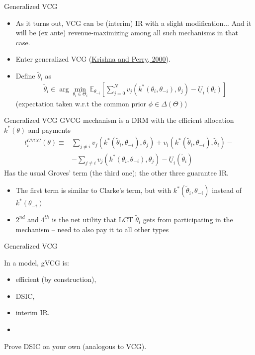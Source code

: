 \documentclass[english,10pt
,aspectratio=169
]{beamer}
\begin{document}
\begin{frame}{Generalized VCG}
	\begin{itemize}
		\item As it turns out, VCG can be (interim) IR with a slight modification... And it will be (ex ante) revenue-maximizing among all such mechanisms in that case.
		\item Enter \alert{generalized VCG} (\href{https://sites.google.com/site/vjkrishna/research}{\uline{Krishna and Perry, 2000}}).
		\pause\medskip
		\item Define  $\tilde{\theta}_i$ as
		\begin{align*}
		\tilde{\theta}_i \in \arg \min_{\theta_i \in \Theta_i} \mathbb{E}_{\theta_{-i}} \left[ \sum_{j=0}^{N} v_j (k^*(\theta_i,\theta_{-i}),\theta_j) - \underline{U}_i (\theta_i) \right]
		\end{align*}
		(expectation taken w.r.t the common prior $\phi \in \varDelta(\Theta)$)
	\end{itemize}
\end{frame}


\begin{frame}{Generalized VCG}
	GVCG mechanism is a DRM with the efficient allocation $k^*(\theta)$ and payments
	\begin{align*}
	t_i^{GVCG} (\theta) \equiv& \sum_{j \neq i} v_j (k^*(\tilde{\theta}_i,\theta_{-i}),\theta_j) + v_i (k^*(\tilde{\theta}_i,\theta_{-i}),\tilde{\theta}_i) -
	\\& - \sum_{j \neq i} v_j (k^*(\theta_i,\theta_{-i}),\theta_j) - \underline{U}_i (\tilde{\theta}_i)
	\end{align*}
	\pause
	Has the usual Groves' term (the third one); the other three guarantee IR.
	\begin{itemize}
		\item The first term is similar to Clarke's term, but with $k^*(\tilde{\theta}_i,\theta_{-i})$ instead of $k^*(\theta_{-i})$
		\item $2^{nd}$ and $4^{th}$ is the net utility that LCT $\tilde{\theta}_i$ gets from participating in the mechanism -- need to also pay it to all other types
	\end{itemize}
\end{frame}


\begin{frame}{Generalized VCG}
	\begin{theorem}
		In a  model, gVCG is:
		\begin{itemize}
			\item efficient (by construction),
			\item DSIC,
			\item interim IR.
			\item %
		\end{itemize}
	\end{theorem}
	Prove DSIC on your own (analogous to VCG).
\end{frame}
\end{document}
